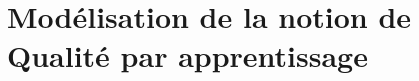 
\lhead[\fancyplain{}{\leftmark}]%
      {\fancyplain{}{}} %
\chead[\fancyplain{}{}]%
      {\fancyplain{}{}}
\rhead[\fancyplain{}{}]%
      {\fancyplain{}{\rightmark}}%
\lfoot[\fancyplain{}{}]%
      {\fancyplain{}{}}
\cfoot[\fancyplain{}{\thepage}]%
      {\fancyplain{}{\thepage}} %
\rfoot[\fancyplain{}{}]%
     {\fancyplain{}{\scriptsize}}



\chapter{Modélisation de la notion de Qualité par apprentissage}
\label{ch:3}

%
%


